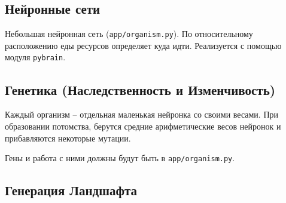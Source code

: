 \documentclass[12pt,a4paper, titlepage]{article}
\begin{document}
\subsection{Нейронные сети}
Небольшая нейронная сеть ({\tt app/organism.py}). 
По относительному расположению еды ресурсов определяет куда идти.
Реализуется с помощью модуля {\tt pybrain}.
\subsection{Генетика (Наследственность и Изменчивость)}
Каждый организм -- отдельная маленькая нейронка со своими весами.
При образовании потомства, берутся средние арифметические весов нейронок и прибавляются некоторые мутации.

Гены и работа с ними должны будут быть в {\tt app/organism.py}.

\subsection{Генерация Ландшафта}
\end{document}
